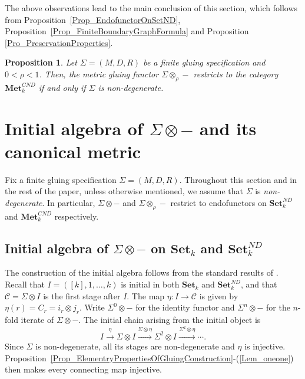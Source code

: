 \documentclass{sn-jnl}%
\theoremstyle{thmstyleone}%
\newtheorem{proposition}[theorem]{Proposition}%
\theoremstyle{thmstyletwo}%
\theoremstyle{thmstylethree}%
\newcommand{\set}{\mathbf{Set}_{k}}
\newcommand{\setnd}{\mathbf{Set}_{k}^{ND}}
\newcommand{\mcnd}{\mathbf{Met}_{k}^{CND}}
\newcommand{\M}{\Sigma}
\newcommand{\F}{\M\otimes}
\newcommand{\Fw}{\M\otimes_{\w}}
\newcommand{\Fi}[1]{\M^{#1}\otimes }
\newcommand{\w}{\rho}
\begin{document}
The above observations lead to the main conclusion of this section, which follows from Proposition~\ref{Prop_EndofunctorOnSetND}, Proposition~\ref{Prop_FiniteBoundaryGraphFormula}  and  Proposition \ref{Pro_PreservationProperties}.

\begin{proposition}
\label{Prop:MetricEndofunctorNondegeneracy}
    Let $\Sigma=(M,D,R)$ be a finite gluing specification and $0<\rho<1$. Then, the metric gluing functor $\Fw-$ restricts to the category $\mcnd$ if and only if $\Sigma$ is non-degenerate.
\end{proposition}

\section{Initial algebra of $\F -$ and its canonical metric}
\label{Sec_InitialAlgebraOfF}
Fix a finite gluing specification $\Sigma=(M,D,R)$. Throughout this section and in the rest of the paper, unless otherwise mentioned, we assume that  $\Sigma$ is \textit{non-degenerate}. In particular, $\F -$ and $\Fw -$ restrict to endofunctors on $\setnd$ and $\mcnd$ respectively.

\subsection{Initial algebra of $\F -$ on $\set$ and $\setnd$}
\label{Subsec_InitialAlgebraOfFonSet}

The construction of the initial algebra follows from the standard results of \cite{AMM,Adamek74}. Recall that $I=([k],1,\ldots,k)$ is initial in both $\set$ and $\setnd$, and that $\mathcal C=\F I$ is the first stage after $I$. The map $\eta:I\to\mathcal C$ is given by $\eta(r)=C_r=i_r\otimes j_r$. Write $\Fi{0}-$ for the identity functor and $\Fi{n}-$ for the $n$-fold iterate of $\F-$. The initial chain arising from the initial object is
\begin{equation}
\label{inichain}
     I\xrightarrow{\eta}\F I \xrightarrow{\F\eta}\Fi{2}I  \xrightarrow{\Fi{2}\eta}\cdots.
\end{equation}
Since $\Sigma$ is non-degenerate, all its stages are non-degenerate and $\eta$ is injective. Proposition~\ref{Prop_ElementryPropertiesOfGluingConstruction}-(\ref{Lem_oneone}) then makes every connecting map injective.
\end{document}
